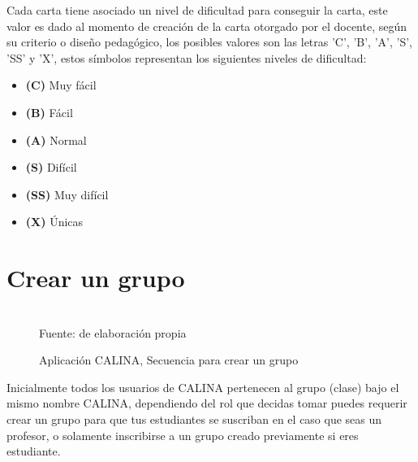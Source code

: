 Cada carta tiene asociado un nivel de dificultad para conseguir la carta, este valor es dado al momento de 
creación de la carta otorgado por el docente, según su criterio o diseño pedagógico, los posibles valores son
las letras 'C', 'B', 'A', 'S', 'SS' y 'X', estos símbolos representan los siguientes niveles de dificultad:

\begin{itemize}
	\item \textbf{(C)} Muy fácil
	\item \textbf{(B)} Fácil
	\item \textbf{(A)} Normal
	\item \textbf{(S)} Difícil
	\item \textbf{(SS)} Muy difícil
	\item \textbf{(X)} Únicas
\end{itemize}

\section{Crear un grupo}

\begin{figure}[!htb]
\caption[]{Aplicación CALINA, Secuencia para crear un grupo}
\centering
\begin{adjustbox}{width=15cm}
\end{adjustbox}
\\
{\footnotesize Fuente: de elaboración propia}
\end{figure}

Inicialmente todos los usuarios de CALINA pertenecen al grupo (clase) bajo el mismo nombre CALINA, dependiendo 
del rol que decidas tomar puedes requerir crear un grupo para que tus estudiantes se suscriban en el caso que 
seas un profesor, o solamente inscribirse a un grupo creado previamente si eres estudiante.

